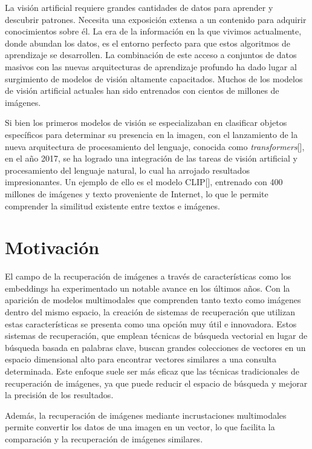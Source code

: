 La visi\'on artificial requiere grandes cantidades de datos para aprender y descubrir patrones. Necesita una exposici\'on extensa a un contenido para adquirir conocimientos sobre \'el. La era de la informaci\'on en la que vivimos actualmente, donde abundan los datos, es el entorno perfecto para que estos algoritmos de aprendizaje se desarrollen. La combinaci\'on de este acceso a conjuntos de datos masivos con las nuevas arquitecturas de aprendizaje profundo ha dado lugar al surgimiento de modelos de visi\'on altamente capacitados. Muchos de los modelos de visi\'on artificial actuales han sido entrenados con cientos de millones de im\'agenes.

Si bien los primeros modelos de visi\'on se especializaban en clasificar objetos espec\'ificos para determinar su presencia en la imagen, con el lanzamiento de la nueva arquitectura de procesamiento del lenguaje, conocida como \textit{transformers}[\cite{transformers}], en el a\~no 2017, se ha logrado una integraci\'on de las tareas de visi\'on artificial y procesamiento del lenguaje natural, lo cual ha arrojado resultados impresionantes. Un ejemplo de ello es el modelo CLIP[\cite{clip-paper}], entrenado con 400 millones de im\'agenes y texto proveniente de Internet, lo que le permite comprender la similitud existente entre textos e im\'agenes.

\section{Motivaci\'on}
El campo de la recuperación de imágenes a través de características como los embeddings ha experimentado un notable avance en los últimos años. Con la aparición de modelos multimodales que comprenden tanto texto como imágenes dentro del mismo espacio, la creación de sistemas de recuperación que utilizan estas características se presenta como una opción muy útil e innovadora. Estos sistemas de recuperación, que emplean técnicas de búsqueda vectorial en lugar de búsqueda basada en palabras clave, buscan grandes colecciones de vectores en un espacio dimensional alto para encontrar vectores similares a una consulta determinada. Este enfoque suele ser más eficaz que las técnicas tradicionales de recuperación de imágenes, ya que puede reducir el espacio de búsqueda y mejorar la precisión de los resultados.

Además, la recuperación de imágenes mediante incrustaciones multimodales permite convertir los datos de una imagen en un vector, lo que facilita la comparación y la recuperación de imágenes similares.

